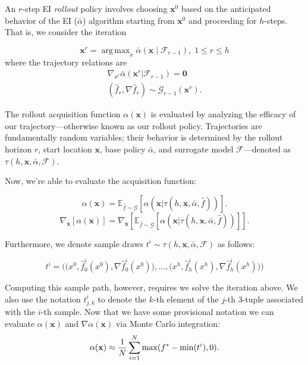 \documentclass{article}
\DeclareMathOperator*{\argmax}{arg\,max}
\begin{document}
An $r$-step EI \textit{rollout} policy involves choosing $\textbf{x}^0$ based on the anticipated behavior of 
the EI ($\bar{\alpha}$) algorithm starting from $\textbf{x}^0$ and proceeding for $h$-steps. That is, we consider the 
iteration

\begin{equation}
    \textbf{x}^r = \argmax_x\bar\alpha(\textbf{x} \;|\; \mathcal{F}_{r-1}), \; 1 \leq r \leq h
\end{equation}
where the trajectory relations are
\begin{align*}
    \nabla_{x^r}\bar{\alpha}(\textbf{x}^r|\mathcal{F}_{r-1})=\textbf{0} \\ \left(\hat{f}_r, 
    \nabla\hat{f}_r\right) \sim \mathcal{G}_{r-1}(\textbf{x}^r).
\end{align*}

The rollout acquisition function $\alpha(\textbf{x})$ is evaluated by analyzing the efficacy of our 
trajectory—otherwise known as our rollout policy. Trajectories are fundamentally random variables; their 
behavior is determined by the rollout horizon $r$, start location $\textbf{x}$, base policy $\bar{\alpha}$, and 
surrogate model $\mathcal{F}$—denoted as $\tau(h,\textbf{x}, \bar{\alpha},\mathcal{F})$. 

Now, we’re able to evaluate the acquisition function:

\begin{equation}
    \alpha(\textbf{x}) = \mathbb{E}_{\hat{f}\sim\mathcal{G}}\left[
    \alpha(\textbf{x}|\tau(h, \textbf{x}, \bar{\alpha}, 
    \hat{f}))\right].
\end{equation}
\begin{equation}
    \nabla_{\textbf{x}}\left[\alpha(\textbf{x})\right] = 
    \nabla_{\textbf{x}}\left[\mathbb{E}_{\hat{f}\sim\mathcal{G}}\left[
    \alpha(\textbf{x}|\tau(h, \textbf{x}, \bar{\alpha}, 
    \hat{f}))\right]\right].
\end{equation}

Furthermore, we denote sample draws $t^i \sim \tau(h, \textbf{x}, \bar{\alpha}, \mathcal{F})$ as follows:

\begin{equation}
    t^i = \bigg( \Big(x^0, \hat{f}_0^i(x^0), \nabla\hat{f}_0^i(x^0)\Big), \dots,\Big(x^h, 
    \hat{f}^i_h(x^h), \nabla\hat{f}^i_h(x^h)\Big) \bigg)  
\end{equation}


Computing this sample path, however, requires we solve the iteration above. We also use the notation $t^i_{j,k}$ 
to denote the $k$-th element of the $j$-th 3-tuple associated with the $i$-th sample.
Now that we have some provisional notation we can evaluate
$\alpha(\textbf{x})$ and $\nabla \alpha(\textbf{x})$ via Monte Carlo 
integration:
\begin{equation}
    \alpha(\textbf{x}) \approx \frac{1}{N}\sum_{i=1}^N \max(f^*-\min(t^i),0). \\
\end{equation}
\end{document}
